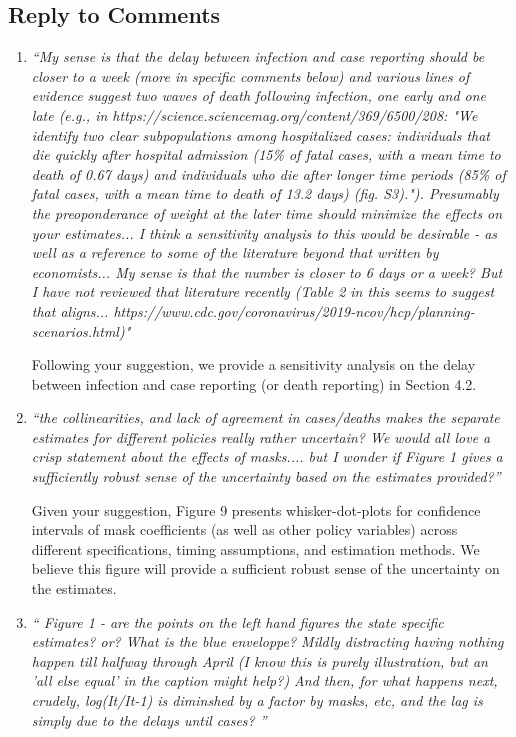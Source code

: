 \documentclass[11pt]{article}
\begin{document}
\changes
\subsection*{Reply to Comments}
\begin{enumerate}

\item  \textit{``My sense is that the delay between infection and case reporting should be closer to a week (more in specific comments below) and various lines of evidence suggest two waves of death following infection, one early and one late (e.g., in https://science.sciencemag.org/content/369/6500/208: "We identify two clear subpopulations among hospitalized cases: individuals that die quickly after hospital admission (15\% of fatal cases, with a mean time to death of 0.67 days) and individuals who die after longer time periods (85\% of fatal cases, with a mean time to death of 13.2 days) (fig. S3)."). Presumably the preoponderance of weight at the later time should minimize the effects on your estimates... I think a sensitivity analysis to this would be desirable - as well as a reference to some of the literature beyond that written by economists... My sense is that the number is closer to 6 days or a week? But I have not reviewed that literature recently (Table 2 in this seems to suggest that aligns... https://www.cdc.gov/coronavirus/2019-ncov/hcp/planning-scenarios.html)"}

Following your suggestion,   we provide a sensitivity analysis on the delay between infection and case reporting (or death reporting) in Section 4.2. 

\item \textit{``the collinearities, and lack of agreement in cases/deaths makes the separate estimates for different policies really rather uncertain? We would all love a crisp statement about the effects of masks.... but I wonder if Figure 1 gives a sufficiently robust sense of the uncertainty  based on the estimates provided?''}
 
Given  your suggestion, Figure 9 presents whisker-dot-plots for confidence intervals of mask coefficients (as well as other policy variables) across different specifications, timing assumptions, and estimation methods. We believe this figure will provide a sufficient robust sense of the uncertainty on the  estimates. 
  
\item \textit{`` Figure 1 - are the points on the left hand figures the state specific estimates? or? What is the blue enveloppe? Mildly distracting having nothing happen till halfway through April (I know this is purely illustration, but an 'all else equal' in the caption might help?) And then, for what happens next, crudely, log(It/It-1) is diminshed by a factor by masks, etc, and the lag is simply due to the delays until cases? ''}


\end{enumerate}
\end{document}
